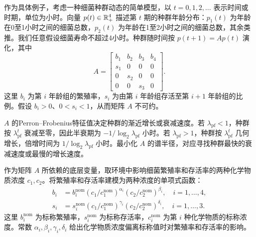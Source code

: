 作为具体例子，考虑一种细菌种群动态的简单模型，以 $t=0,1,2,\ldots$ 表示时间或时期，单位为小时。向量 $p(t)\in\mathbb R_+^4$ 描述第 $t$ 期的种群年龄分布：$p_1(t)$ 为年龄在0至1小时之间的细菌总数，$p_2(t)$ 为年龄在1至2小时之间的细菌总数，其余类推。我们任意假设细菌寿命不超过4小时。种群随时间按 $p(t+1)=Ap(t)$ 演化，其中
\[
A=\begin{bmatrix}b_1&b_2&b_3&b_4\\s_1&0&0&0\\0&s_2&0&0\\0&0&s_3&0\end{bmatrix}.
\]
这里 $b_i$ 为第 $i$ 年龄组的繁殖率，$s_i$ 为由第 $i$ 年龄组存活至第 $i+1$ 年龄组的比例。假设 $b_i>0$、$0<s_i<1$，从而矩阵 $A$ 不可约。

$A$ 的Perron--Frobenius特征值决定种群的渐近增长或衰减速度。若 $\lambda_{\mathrm{pf}}<1$，种群按 $\lambda_{\mathrm{pf}}^t$ 衰减至零，因此半衰期为 $-1/\log_2\lambda_{\mathrm{pf}}$ 小时。若 $\lambda_{\mathrm{pf}}>1$，种群按 $\lambda_{\mathrm{pf}}^t$ 几何增长，倍增时间为 $1/\log_2\lambda_{\mathrm{pf}}$ 小时。最小化 $A$ 的谱半径，对应寻找种群最快的衰减速度或最慢的增长速度。

作为矩阵 $A$ 所依赖的底层变量，取环境中影响细菌繁殖率和存活率的两种化学物质浓度 $c_1,c_2$。将繁殖率和存活率建模为两种浓度的单项式函数：
\[
\begin{aligned}
b_i&=b_i^{\mathrm{nom}}(c_1/c_1^{\mathrm{nom}})^{\alpha_i}(c_2/c_2^{\mathrm{nom}})^{\beta_i},\quad i=1,\ldots,4,\\
s_i&=s_i^{\mathrm{nom}}(c_1/c_1^{\mathrm{nom}})^{\gamma_i}(c_2/c_2^{\mathrm{nom}})^{\delta_i},\quad i=1,\ldots,3.
\end{aligned}
\]
这里 $b_i^{\mathrm{nom}}$ 为标称繁殖率，$s_i^{\mathrm{nom}}$ 为标称存活率，$c_i^{\mathrm{nom}}$ 为第 $i$ 种化学物质的标称浓度。常数 $\alpha_i,\beta_i,\gamma_i,\delta_i$ 给出化学物质浓度偏离标称值时对繁殖率和存活率的影响。
